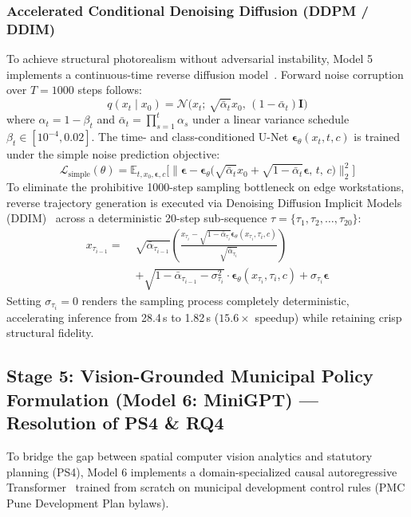 \documentclass[journal]{IEEEtran}
\begin{document}
\subsubsection{Accelerated Conditional Denoising Diffusion (DDPM / DDIM)}
To achieve structural photorealism without adversarial instability, Model 5 implements a continuous-time reverse diffusion model~\cite{ho2020denoising}. Forward noise corruption over $T=1000$ steps follows:
\begin{equation}
q(x_t \mid x_0) = \mathcal{N}\big(x_t;\, \sqrt{\bar{\alpha}_t}x_0,\, (1 - \bar{\alpha}_t)\mathbf{I}\big)
\label{eq:diff_forward}
\end{equation}
where $\alpha_t = 1 - \beta_t$ and $\bar{\alpha}_t = \prod_{s=1}^t \alpha_s$ under a linear variance schedule $\beta_t \in [10^{-4}, 0.02]$. The time- and class-conditioned U-Net $\bm{\epsilon}_\theta(x_t, t, c)$ is trained under the simple noise prediction objective:
\begin{equation}
\mathcal{L}_{\text{simple}}(\theta) = \mathbb{E}_{t, x_0, \bm{\epsilon}, c}\Big[\big\|\bm{\epsilon} - \bm{\epsilon}_\theta\big(\sqrt{\bar{\alpha}_t}x_0 + \sqrt{1 - \bar{\alpha}_t}\bm{\epsilon},\, t,\, c\big)\big\|_2^2\Big]
\label{eq:diff_loss}
\end{equation}
To eliminate the prohibitive 1000-step sampling bottleneck on edge workstations, reverse trajectory generation is executed via Denoising Diffusion Implicit Models (DDIM)~\cite{song2020denoising} across a deterministic 20-step sub-sequence $\tau = \{\tau_1, \tau_2, \dots, \tau_{20}\}$:
\begin{align}
x_{\tau_{i-1}} = \;& \sqrt{\bar{\alpha}_{\tau_{i-1}}} \left(\frac{x_{\tau_i} - \sqrt{1 - \bar{\alpha}_{\tau_i}}\bm{\epsilon}_\theta(x_{\tau_i}, \tau_i, c)}{\sqrt{\bar{\alpha}_{\tau_i}}}\right) \nonumber \\
& + \sqrt{1 - \bar{\alpha}_{\tau_{i-1}} - \sigma_{\tau_i}^2} \cdot \bm{\epsilon}_\theta(x_{\tau_i}, \tau_i, c) + \sigma_{\tau_i} \bm{\epsilon}
\label{eq:ddim_sample}
\end{align}
Setting $\sigma_{\tau_i} = 0$ renders the sampling process completely deterministic, accelerating inference from 28.4\,s to 1.82\,s ($15.6\times$ speedup) while retaining crisp structural fidelity.

\subsection{Stage 5: Vision-Grounded Municipal Policy Formulation (Model 6: MiniGPT) --- Resolution of PS4 \& RQ4}
To bridge the gap between spatial computer vision analytics and statutory planning (PS4), Model 6 implements a domain-specialized causal autoregressive Transformer~\cite{vaswani2017attention,radford2019language} trained from scratch on municipal development control rules (PMC Pune Development Plan bylaws).
\end{document}
